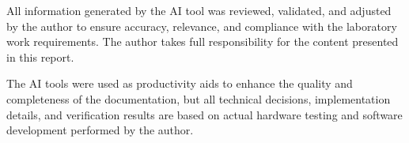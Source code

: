\documentclass[12pt]{article}
\begin{document}
All information generated by the AI tool was reviewed, validated, and adjusted by the author to ensure accuracy, relevance, and compliance with the laboratory work requirements. The author takes full responsibility for the content presented in this report.

The AI tools were used as productivity aids to enhance the quality and completeness of the documentation, but all technical decisions, implementation details, and verification results are based on actual hardware testing and software development performed by the author.
\end{document}

